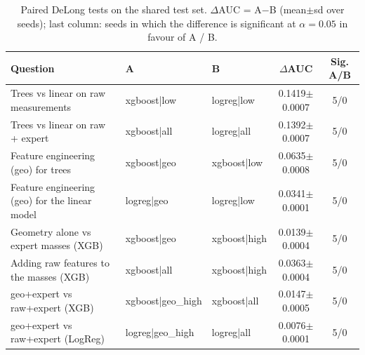 \begin{table}[!t]
\centering
\caption{Paired DeLong tests on the shared test set. $\Delta$AUC = A$-$B (mean$\pm$sd over seeds); last column: seeds in which the difference is significant at $\alpha=0.05$ in favour of A / B.}
\label{tab:comparisons}
\footnotesize
\setlength{\tabcolsep}{3.5pt}
\begin{tabular}{lllcc}
\toprule
Question & A & B & $\Delta$AUC & Sig. A/B \\
\midrule
Trees vs linear on raw measurements & xgboost|low & logreg|low & 0.1419$\pm$0.0007 & 5/0 \\
Trees vs linear on raw + expert & xgboost|all & logreg|all & 0.1392$\pm$0.0007 & 5/0 \\
Feature engineering (geo) for trees & xgboost|geo & xgboost|low & 0.0635$\pm$0.0008 & 5/0 \\
Feature engineering (geo) for the linear model & logreg|geo & logreg|low & 0.0341$\pm$0.0001 & 5/0 \\
Geometry alone vs expert masses (XGB) & xgboost|geo & xgboost|high & 0.0139$\pm$0.0004 & 5/0 \\
Adding raw features to the masses (XGB) & xgboost|all & xgboost|high & 0.0363$\pm$0.0004 & 5/0 \\
geo+expert vs raw+expert (XGB) & xgboost|geo\_high & xgboost|all & 0.0147$\pm$0.0005 & 5/0 \\
geo+expert vs raw+expert (LogReg) & logreg|geo\_high & logreg|all & 0.0076$\pm$0.0001 & 5/0 \\
\bottomrule
\end{tabular}
\end{table}
